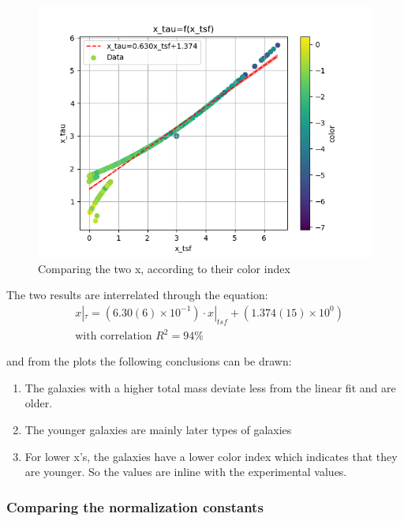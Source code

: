 \documentclass[a4paper,twocolumn]{article}
\begin{document}
\begin{figure}[!htpb]
\centering
\includegraphics[width=.9\linewidth]{./figs/x_tsf-x_tau-color_color.png}
\caption{\label{fig:Comparing the two x, according to their color index}Comparing the two x, according to their color index}
\end{figure}

The two results are interrelated through the equation:
\begin{equation}\label{eq:x_tsf-x_tau}
\begin{align}
& x|_\tau = (6.30(6) \times 10^{-1})\cdot x|_{tsf} + (1.374(15) \times 10^{0}) \\ 
& \textrm{with correlation } R^2=94\%
\end{align}
\end{equation}
\noindent

and from the plots the following conclusions can be drawn:

\begin{enumerate}
\item The galaxies with a higher total mass deviate less from the linear fit and are older.
\item The younger galaxies are mainly later types of galaxies
\item For lower x's, the galaxies have a lower color index which indicates that they are younger. So the values are inline with the experimental values.
\end{enumerate}

\subsubsection{Comparing the normalization constants}
\label{sec:org4a59895}
\end{document}
